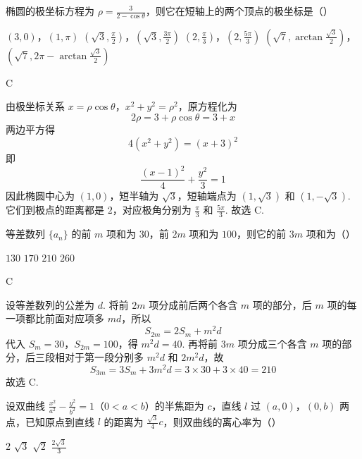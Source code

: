 \documentclass[UTF8,a4paper,oneside,11pt]{ctexbook}
\begin{document}
\begin{problem}
椭圆的极坐标方程为 \(\rho = \frac{3}{2 - \cos\theta}\)，则它在短轴上的两个顶点的极坐标是（\quad）

\choices
    {\((3,0)\)，\((1,\pi)\)}
    {\(\left(\sqrt{3},\frac{\pi}{2}\right)\)，\(\left(\sqrt{3},\frac{3\pi}{2}\right)\)}
    {\(\left(2,\frac{\pi}{3}\right)\)，\(\left(2,\frac{5\pi}{3}\right)\)}
    {\(\left(\sqrt{7}, \arctan \frac{\sqrt{3}}{2}\right)\)，\(\left(\sqrt{7}, 2\pi - \arctan \frac{\sqrt{3}}{2}\right)\)}
\end{problem}

\begin{answer}
C
\end{answer}

\begin{solution}
由极坐标关系 \(x=\rho\cos\theta\)，\(x^2+y^2=\rho^2\)，原方程化为
\[
2\rho=3+\rho\cos\theta=3+x
\]
两边平方得
\[
4(x^2+y^2)=(x+3)^2
\]
即
\[
\frac{(x-1)^2}{4}+\frac{y^2}{3}=1
\]
因此椭圆中心为 \((1,0)\)，短半轴为 \(\sqrt3\)，短轴端点为 \((1,\sqrt3)\) 和 \((1,-\sqrt3)\). 它们到极点的距离都是 \(2\)，对应极角分别为 \(\frac{\pi}{3}\) 和 \(\frac{5\pi}{3}\). 故选 C.
\end{solution}

\begin{problem}
等差数列 \(\{a_{n}\}\) 的前 \(m\) 项和为 \(30\)，前 \(2m\) 项和为 \(100\)，则它的前 \(3m\) 项和为（\quad）

\choices
    {\(130\)}
    {\(170\)}
    {\(210\)}
    {\(260\)}
\end{problem}

\begin{answer}
C
\end{answer}

\begin{solution}
设等差数列的公差为 \(d\). 将前 \(2m\) 项分成前后两个各含 \(m\) 项的部分，后 \(m\) 项的每一项都比前面对应项多 \(md\)，所以
\[
S_{2m}=2S_m+m^2d
\]
代入 \(S_m=30\)，\(S_{2m}=100\)，得 \(m^2d=40\). 再将前 \(3m\) 项分成三个各含 \(m\) 项的部分，后三段相对于第一段分别多 \(m^2d\) 和 \(2m^2d\)，故
\[
S_{3m}=3S_m+3m^2d=3\times30+3\times40=210
\]
故选 C.
\end{solution}

\begin{problem}
设双曲线 \(\frac{x^2}{a^2} - \frac{y^2}{b^2} = 1\)（\(0 < a < b\)）的半焦距为 \(c\)，直线 \(l\) 过 \((a,0)\)，\((0,b)\) 两点，已知原点到直线 \(l\) 的距离为 \(\frac{\sqrt{3}}{4} c\)，则双曲线的离心率为（\quad）

\choices
    {\(2\)}
    {\(\sqrt{3}\)}
    {\(\sqrt{2}\)}
    {\(\frac{2\sqrt{3}}{3}\)}
\end{problem}
\end{document}
